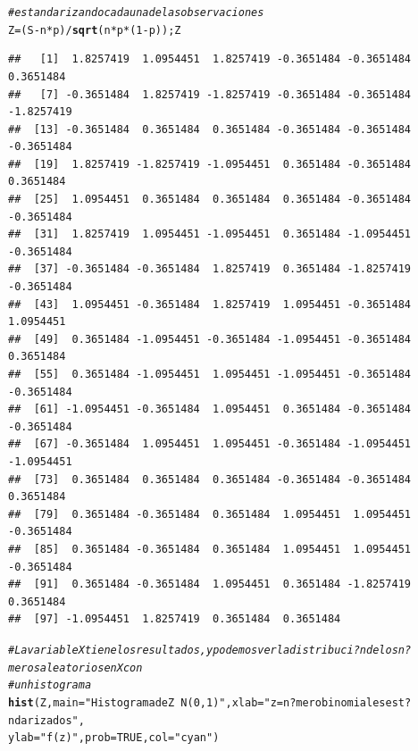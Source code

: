 \documentclass[10pt,a4paper]{article}\usepackage[]{graphicx}\usepackage[]{color}
\makeatletter
\newcommand{\hlnum}[1]{\textcolor[rgb]{0.686,0.059,0.569}{#1}}%
\newcommand{\hlstr}[1]{\textcolor[rgb]{0.192,0.494,0.8}{#1}}%
\newcommand{\hlcom}[1]{\textcolor[rgb]{0.678,0.584,0.686}{\textit{#1}}}%
\newcommand{\hlopt}[1]{\textcolor[rgb]{0,0,0}{#1}}%
\newcommand{\hlstd}[1]{\textcolor[rgb]{0.345,0.345,0.345}{#1}}%
\newcommand{\hlkwb}[1]{\textcolor[rgb]{0.69,0.353,0.396}{#1}}%
\newcommand{\hlkwc}[1]{\textcolor[rgb]{0.333,0.667,0.333}{#1}}%
\newcommand{\hlkwd}[1]{\textcolor[rgb]{0.737,0.353,0.396}{\textbf{#1}}}%
\newenvironment{kframe}{%
 \def\at@end@of@kframe{}%
 \ifinner\ifhmode%
  \def\at@end@of@kframe{\end{minipage}}%
  \begin{minipage}{\columnwidth}%
 \fi\fi%
 \def\FrameCommand##1{\hskip\@totalleftmargin \hskip-\fboxsep
 \colorbox{shadecolor}{##1}\hskip-\fboxsep
     \hskip-\linewidth \hskip-\@totalleftmargin \hskip\columnwidth}%
 \MakeFramed {\advance\hsize-\width
   \@totalleftmargin\z@ \linewidth\hsize
   \@setminipage}}%
 {\par\unskip\endMakeFramed%
 \at@end@of@kframe}
\newenvironment{knitrout}{}{} %
\makeatother
\begin{document}
\begin{knitrout}
\begin{kframe}
\begin{alltt}
\hlcom{# estandarizando cada una de las observaciones }
\hlstd{Z} \hlkwb{=} \hlstd{(S}\hlopt{-}\hlstd{n}\hlopt{*}\hlstd{p)}\hlopt{/}\hlkwd{sqrt}\hlstd{(n}\hlopt{*}\hlstd{p}\hlopt{*}\hlstd{(}\hlnum{1}\hlopt{-}\hlstd{p)); Z}
\end{alltt}
\begin{verbatim}
##   [1]  1.8257419  1.0954451  1.8257419 -0.3651484 -0.3651484  0.3651484
##   [7] -0.3651484  1.8257419 -1.8257419 -0.3651484 -0.3651484 -1.8257419
##  [13] -0.3651484  0.3651484  0.3651484 -0.3651484 -0.3651484 -0.3651484
##  [19]  1.8257419 -1.8257419 -1.0954451  0.3651484 -0.3651484  0.3651484
##  [25]  1.0954451  0.3651484  0.3651484  0.3651484 -0.3651484 -0.3651484
##  [31]  1.8257419  1.0954451 -1.0954451  0.3651484 -1.0954451 -0.3651484
##  [37] -0.3651484 -0.3651484  1.8257419  0.3651484 -1.8257419 -0.3651484
##  [43]  1.0954451 -0.3651484  1.8257419  1.0954451 -0.3651484  1.0954451
##  [49]  0.3651484 -1.0954451 -0.3651484 -1.0954451 -0.3651484  0.3651484
##  [55]  0.3651484 -1.0954451  1.0954451 -1.0954451 -0.3651484 -0.3651484
##  [61] -1.0954451 -0.3651484  1.0954451  0.3651484 -0.3651484 -0.3651484
##  [67] -0.3651484  1.0954451  1.0954451 -0.3651484 -1.0954451 -1.0954451
##  [73]  0.3651484  0.3651484  0.3651484 -0.3651484 -0.3651484  0.3651484
##  [79]  0.3651484 -0.3651484  0.3651484  1.0954451  1.0954451 -0.3651484
##  [85]  0.3651484 -0.3651484  0.3651484  1.0954451  1.0954451 -0.3651484
##  [91]  0.3651484 -0.3651484  1.0954451  0.3651484 -1.8257419  0.3651484
##  [97] -1.0954451  1.8257419  0.3651484  0.3651484
\end{verbatim}
\begin{alltt}
\hlcom{#La variable X tiene los resultados, y podemos ver ladistribuci?n de los n?meros aleatorios en X con }
\hlcom{#un histograma}
\hlkwd{hist}\hlstd{(Z,} \hlkwc{main}\hlstd{=}\hlstr{"Histograma de Z ~ N(0, 1)"}\hlstd{,} \hlkwc{xlab}\hlstd{=}\hlstr{"z = n?mero binomiales est?ndarizados"}\hlstd{,}
\hlkwc{ylab}\hlstd{=}\hlstr{"f(z)"}\hlstd{,} \hlkwc{prob}\hlstd{=}\hlnum{TRUE}\hlstd{,} \hlkwc{col}\hlstd{=}\hlstr{"cyan"}\hlstd{)}
\end{alltt}
\end{kframe}

\end{knitrout}
\end{document}
